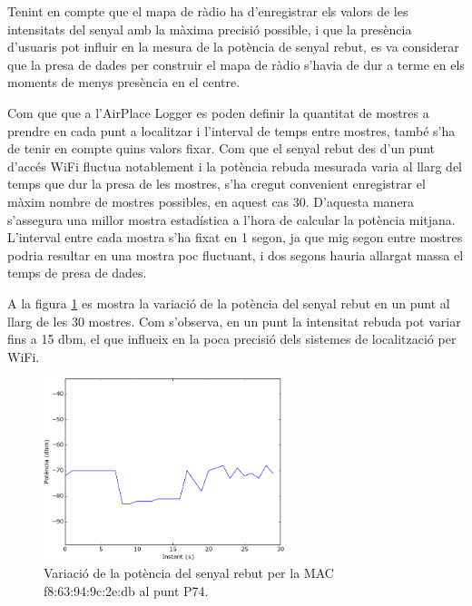 Tenint en compte que el mapa de ràdio ha d'enregistrar els valors de les intensitats del senyal amb la màxima precisió possible, i que la presència d'usuaris pot influir en la mesura de la potència de senyal rebut, es va considerar que la presa de dades per construir el mapa de ràdio s'havia de dur a terme en els moments de menys presència en el centre.

Com que que a l'AirPlace Logger es poden definir la quantitat de mostres a prendre en cada punt a localitzar i l'interval de temps entre mostres, també s'ha de tenir en compte quins valors fixar. Com que el senyal rebut des d'un punt d'accés WiFi fluctua notablement i la potència rebuda mesurada varia al llarg del temps que dur la presa de les mostres, s'ha cregut convenient enregistrar el màxim nombre de mostres possibles, en aquest cas 30. D'aquesta manera s'assegura una millor mostra estadística a l'hora de calcular la potència mitjana. L'interval entre cada mostra s'ha fixat en 1 segon, ja que mig segon entre mostres podria resultar en una mostra poc fluctuant, i dos segons hauria allargat massa el temps de presa de dades.

A la figura \ref{fig:fluctuacio} es mostra la variació de la potència del senyal rebut en un punt al llarg de les 30 mostres. Com s'observa, en un punt la intensitat rebuda pot variar fins a 15 dbm, el que influeix en la poca precisió dels sistemes de localització per WiFi.

\begin{figure}[ht]
\begin{center}
\includegraphics[width=7cm]{imatges/fluctuacio.png}
\caption{Variació de la potència del senyal rebut per la MAC f8:63:94:9c:2e:db al punt P74.}
\label{fig:fluctuacio}
\end{center}
\end{figure}
